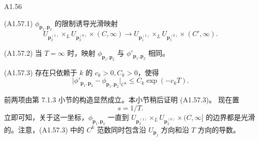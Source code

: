 \begin{proposition}{A1.56}\label{prop:a1-56}
\par\smallskip\noindent\textup{(A1.57.1)}\quad
$\phi_{\mathbf p_1,\mathbf p_2}$ 的限制诱导光滑映射
\[
 U_{\mathbf p_2^{(1)}}\mathbin{\times_L}U_{\mathbf p_2^{(0)}}
 \times(C,\infty)
 \longrightarrow
 U_{\mathbf p_1^{(1)}}\mathbin{\times_L}U_{\mathbf p_1^{(0)}}
 \times(C',\infty).
\]

\par\smallskip\noindent\textup{(A1.57.2)}\quad
当 $T=\infty$ 时，映射 $\phi_{\mathbf p_1,\mathbf p_2}$ 与
$\phi'_{\mathbf p_1,\mathbf p_2}$ 相同。

\par\smallskip\noindent\textup{(A1.57.3)}\quad
存在只依赖于 $k$ 的 $c_k>0,C_k>0$，使得
\[
 \bigl\lvert
 \phi'_{\mathbf p_1,\mathbf p_2}-\phi_{\mathbf p_1,\mathbf p_2}
 \bigr\rvert_{C^k}
 \leq C_k\exp(-c_kT).
\]
\end{proposition}

前两项由第 7.1.3 小节的构造显然成立。本小节稍后证明 (A1.57.3)。
现在置
\[
 s=1/T.
\]
立即可知，关于这一坐标，$\phi_{\mathbf p_1,\mathbf p_2}$ 一直到
$U_{\mathbf p_2^{(1)}}\times_LU_{\mathbf p_2^{(0)}}\times(C,\infty]$
的边界都是光滑的。注意，(A1.57.3) 中的 $C^k$ 范数同时包含沿
$U_{\mathbf p_j}$ 方向和沿 $T$ 方向的导数。

